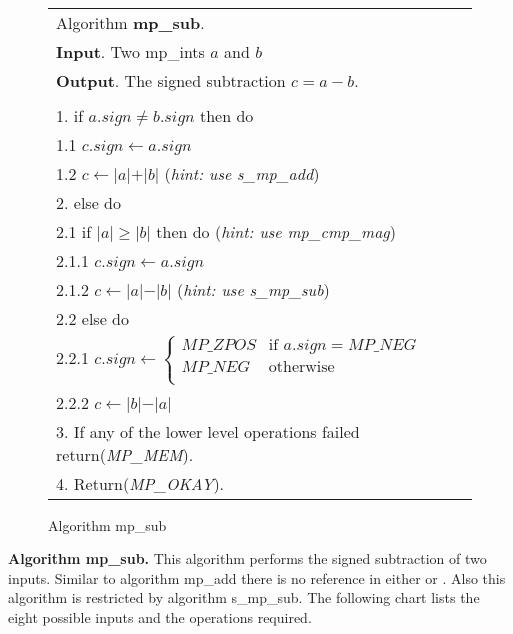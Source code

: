 \documentclass[b5paper]{book}
\begin{document}
\begin{figure}[!here]
\begin{center}
\begin{tabular}{l}
\hline Algorithm \textbf{mp\_sub}. \\
\textbf{Input}.   Two mp\_ints $a$ and $b$  \\
\textbf{Output}.  The signed subtraction $c = a - b$. \\
\hline \\
1.  if $a.sign \ne b.sign$ then do \\
\hspace{3mm}1.1  $c.sign \leftarrow a.sign$ \\
\hspace{3mm}1.2  $c \leftarrow \vert a \vert + \vert b \vert$ (\textit{hint: use s\_mp\_add}) \\
2.  else do \\
\hspace{3mm}2.1  if $\vert a \vert \ge \vert b \vert$ then do (\textit{hint: use mp\_cmp\_mag}) \\
\hspace{6mm}2.1.1  $c.sign \leftarrow a.sign$ \\
\hspace{6mm}2.1.2  $c \leftarrow \vert a \vert  - \vert b \vert$ (\textit{hint: use s\_mp\_sub}) \\
\hspace{3mm}2.2  else do \\
\hspace{6mm}2.2.1  $c.sign \leftarrow  \left \lbrace \begin{array}{ll}
                              MP\_ZPOS &  \mbox{if }a.sign = MP\_NEG \\
                              MP\_NEG  &  \mbox{otherwise} \\
                              \end{array} \right .$ \\
\hspace{6mm}2.2.2  $c \leftarrow \vert b \vert  - \vert a \vert$ \\
3.  If any of the lower level operations failed return(\textit{MP\_MEM}). \\
4.  Return(\textit{MP\_OKAY}). \\
\hline
\end{tabular}
\end{center}
\caption{Algorithm mp\_sub}
\end{figure}

\textbf{Algorithm mp\_sub.}
This algorithm performs the signed subtraction of two inputs.  Similar to algorithm mp\_add there is no reference in either \cite{TAOCPV2} or 
\cite{HAC}.  Also this algorithm is restricted by algorithm s\_mp\_sub.  The following chart lists the eight possible inputs and
the operations required.
\end{document}
